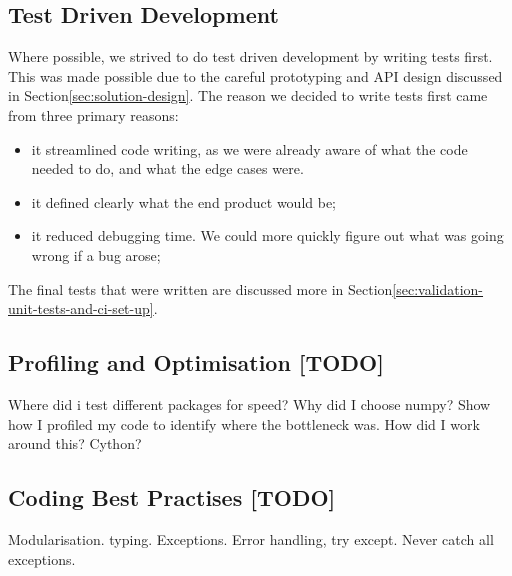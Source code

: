     \subsection{Test Driven Development}\label{subsec:test-driven-development}
    Where possible, we strived to do test driven development by writing tests first.
    This was made possible due to the careful prototyping and API design discussed in Section\eqref{sec:solution-design}.
    The reason we decided to write tests first came from three primary reasons:
    \begin{itemize}
        \item it streamlined code writing, as we were already aware of what the code needed to do, and what the edge cases
        were.
        \item it defined clearly what the end product would be;
        \item it reduced debugging time.
        We could more quickly figure out what was going wrong if a bug arose;
    \end{itemize}
    The final tests that were written are discussed more in Section\eqref{sec:validation-unit-tests-and-ci-set-up}.

    \subsection{Profiling and Optimisation [TODO]}\label{subsec:profiling-and-optimisation}
    Where did i test different packages for speed? Why did I choose numpy?
    Show how I profiled my code to identify where the bottleneck was.
    How did I work around this? Cython?

    \subsection{Coding Best Practises [TODO]}\label{subsec:coding-best-practises}
    Modularisation.
    typing.
    Exceptions. Error handling, try except. Never catch all exceptions.
